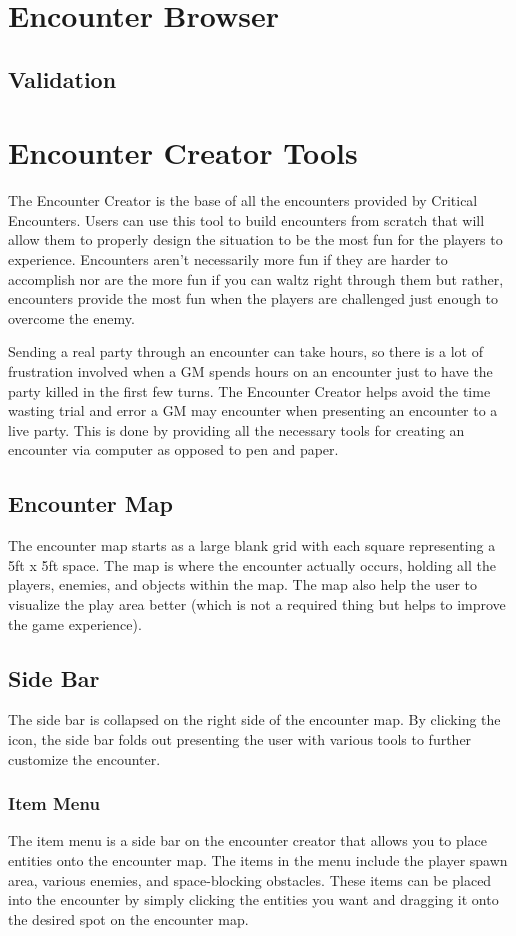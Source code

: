 \documentclass[12pt,a4paper]{report}
\begin{document}
	\section{Encounter Browser}
		\subsection{Validation}
	\section{Encounter Creator Tools}
	The Encounter Creator is the base of all the encounters provided by Critical Encounters. Users can use this tool to build encounters from scratch that will allow them to properly design the situation to be the most fun for the players to experience. Encounters aren't necessarily more fun if they are harder to accomplish nor are the more fun if you can waltz right through them but rather, encounters provide the most fun when the players are challenged just enough to overcome the enemy. 
	
	Sending a real party through an encounter can take hours, so there is a lot of frustration involved when a GM spends hours on an encounter just to have the party killed in the first few turns. The Encounter Creator helps avoid the time wasting trial and error a GM may encounter when presenting an encounter to a live party. This is done by providing all the necessary tools for creating an encounter via computer as opposed to pen and paper.
		\subsection{Encounter Map}
		The encounter map starts as a large blank grid with each square representing a 5ft x 5ft space. The map is where the encounter actually occurs, holding all the players, enemies, and objects within the map. The map also help the user to visualize the play area better (which is not a required thing but helps to improve the game experience).  
		\subsection{Side Bar}
		The side bar is collapsed on the right side of the encounter map. By clicking the icon, the side bar folds out presenting the user with various tools to further customize the encounter.
			\subsubsection{Item Menu}
			The item menu is a side bar on the encounter creator that allows you to place entities onto the encounter map. The items in the menu include the player spawn area, various enemies, and space-blocking obstacles. These items can be placed into the encounter by simply clicking the entities you want and dragging it onto the desired spot on the encounter map.
\end{document}

